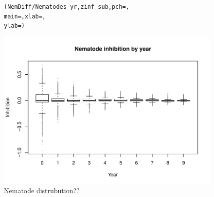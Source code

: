 \documentclass[11pt]{article}
\begin{document}
\begin{figure}
\begin{knitrout}
\color{fgcolor}\begin{kframe}
\begin{alltt}
(NemDiff/Nematodes ~ yr, zinf_sub, pch = , 
    main = , xlab = , 
    ylab = )
\end{alltt}
\end{kframe}

{\centering \includegraphics{figure/box1} 

}



\end{knitrout}

\caption[boxplot1]{Nematode distrubution??}
\end{figure}
\end{document}
